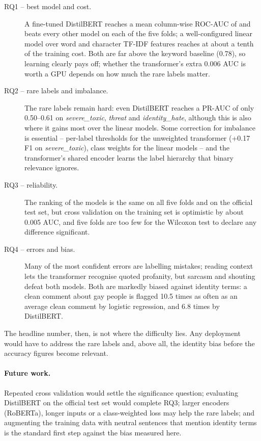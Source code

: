 \documentclass[11pt,a4paper]{article}
\begin{document}
\begin{description}
  \item[RQ1 -- best model and cost.]  A fine-tuned DistilBERT reaches a mean
    column-wise ROC-AUC of \BestAUC{} and beats every other model on each of
    the five folds; a well-configured linear model over word and character
    TF-IDF features reaches \RunnerUpAUC{} at about a tenth of the training
    cost.  Both are far above the keyword baseline (0.78), so learning clearly
    pays off; whether the transformer's extra 0.006 AUC is worth a GPU depends
    on how much the rare labels matter.
  \item[RQ2 -- rare labels and imbalance.]  The rare labels remain hard: even
    DistilBERT reaches a PR-AUC of only 0.50--0.61 on \emph{severe\_toxic},
    \emph{threat} and \emph{identity\_hate}, although this is also where it
    gains most over the linear models.  Some correction for imbalance is
    essential -- per-label thresholds for the unweighted transformer
    (+0.17 F1 on \emph{severe\_toxic}), class weights for the linear models --
    and the transformer's shared encoder learns the label hierarchy that
    binary relevance ignores.
  \item[RQ3 -- reliability.]  The ranking of the models is the same on all
    five folds and on the official test set, but cross validation on the
    training set is optimistic by about 0.005 AUC, and five folds are too few
    for the Wilcoxon test to declare any difference significant.
  \item[RQ4 -- errors and bias.]  Many of the most confident errors are
    labelling mistakes; reading context lets the transformer recognise quoted
    profanity, but sarcasm and shouting defeat both models.  Both are markedly
    biased against identity terms: a clean comment about gay people is flagged
    10.5 times as often as an average clean comment by logistic regression, and
    6.8 times by DistilBERT.
\end{description}

The headline number, then, is not where the difficulty lies.  Any deployment
would have to address the rare labels and, above all, the identity bias before
the accuracy figures become relevant.

\paragraph{Future work.}  Repeated cross validation would settle the
significance question; evaluating DistilBERT on the official test set would
complete RQ3; larger encoders (RoBERTa), longer inputs or a class-weighted loss
may help the rare labels; and augmenting the training data with neutral
sentences that mention identity terms is the standard first step against the
bias measured here.
\end{document}
